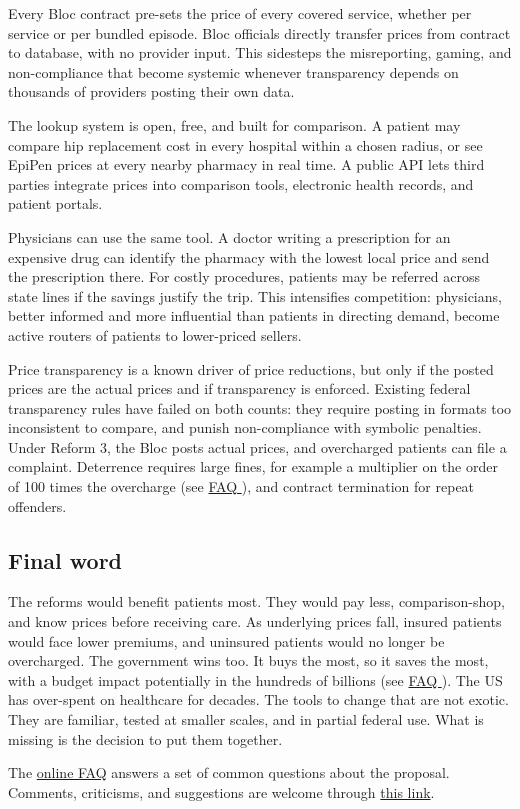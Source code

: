 \documentclass[12pt]{article}
\begin{document}
Every Bloc contract pre-sets the price of every covered service, whether per service or per bundled episode. Bloc officials directly transfer prices from contract to database, with no provider input. This sidesteps the misreporting, gaming, and non-compliance that become systemic whenever transparency depends on thousands of providers posting their own data.

The lookup system is open, free, and built for comparison. A patient may compare hip replacement cost in every hospital within a chosen radius, or see EpiPen prices at every nearby pharmacy in real time. A public API lets third parties integrate prices into comparison tools, electronic health records, and patient portals.

Physicians can use the same tool. A doctor writing a prescription for an expensive drug can identify the pharmacy with the lowest local price and send the prescription there. For costly procedures, patients may be referred across state lines if the savings justify the trip. This intensifies competition: physicians, better informed and more influential than patients in directing demand, become active routers of patients to lower-priced sellers.

Price transparency is a known driver of price reductions,\citep{robinson2013calpers, whaley2019nh} but only if the posted prices are the actual prices and if transparency is enforced. Existing federal transparency rules have failed on both counts:\citep{jiang2022transparency} they require posting in formats too inconsistent to compare, and punish non-compliance with symbolic penalties. Under Reform 3, the Bloc posts actual prices, and overcharged patients can file a complaint. Deterrence requires large fines, for example a multiplier on the order of 100 times the overcharge (see \href{https://rabbanimaysam.github.io/health_reform/faq.html}{FAQ \faqFines}), and contract termination for repeat offenders.

\subsection*{Final word}

The reforms would benefit patients most. They would pay less, comparison-shop, and know prices before receiving care. As underlying prices fall, insured patients would face lower premiums, and uninsured patients would no longer be overcharged. The government wins too. It buys the most, so it saves the most, with a budget impact potentially in the hundreds of billions (see \href{https://rabbanimaysam.github.io/health_reform/faq.html}{FAQ \faqFiscal}). The US has over-spent on healthcare for decades. The tools to change that are not exotic. They are familiar, tested at smaller scales, and in partial federal use. What is missing is the decision to put them together.

The \href{https://rabbanimaysam.github.io/health_reform/faq.html}{online FAQ} answers a set of common questions about the proposal. Comments, criticisms, and suggestions are welcome through \href{https://rabbanimaysam.github.io/health_reform/}{this link}.

{\scriptsize
\setlength{\bibsep}{0pt}

}
\end{document}
